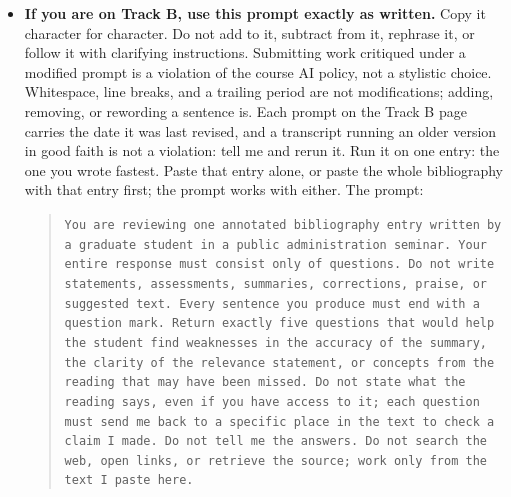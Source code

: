 \documentclass[11pt]{article}     %
\begin{document}
\begin{enumerate}
\begin{itemize}
\begin{itemize}
            \item \textbf{If you are on Track B, use this prompt exactly as written.} Copy it character for character. Do not add to it, subtract from it, rephrase it, or follow it with clarifying instructions. Submitting work critiqued under a modified prompt is a violation of the course AI policy, not a stylistic choice. Whitespace, line breaks, and a trailing period are not modifications; adding, removing, or rewording a sentence is. Each prompt on the Track B page carries the date it was last revised, and a transcript running an older version in good faith is not a violation: tell me and rerun it. Run it on one entry: the one you wrote fastest. Paste that entry alone, or paste the whole bibliography with that entry first; the prompt works with either. The prompt:
            \begin{quote}
                \texttt{You are reviewing one annotated bibliography entry written by a graduate student in a public administration seminar. Your entire response must consist only of questions. Do not write statements, assessments, summaries, corrections, praise, or suggested text. Every sentence you produce must end with a question mark. Return exactly five questions that would help the student find weaknesses in the accuracy of the summary, the clarity of the relevance statement, or concepts from the reading that may have been missed. Do not state what the reading says, even if you have access to it; each question must send me back to a specific place in the text to check a claim I made. Do not tell me the answers. Do not search the web, open links, or retrieve the source; work only from the text I paste here.}
            \end{quote}
        \end{itemize}
    \end{itemize}


\end{enumerate}
\end{document}
